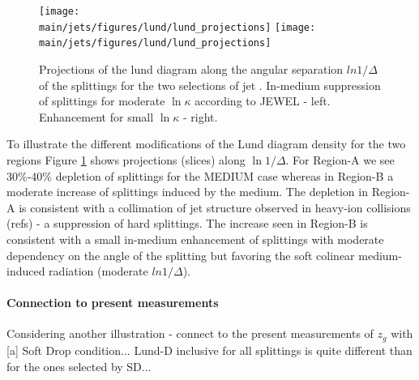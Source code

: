 \begin{figure}[htbp]
	\centering
	\texttt{[image: \\main/jets/figures/lund/lund\_projections]}
	\texttt{[image: \\main/jets/figures/lund/lund\_projections]}
	\caption{Projections of the lund diagram along the angular separation $ln 1/\Delta$ of the splittings for the two selections of jet \pt. In-medium suppression of splittings for moderate $\ln{\kappa}$ according to JEWEL - left. Enhancement for small $\ln{\kappa}$ - right.}
	\label{fig:Lund_projections}
\end{figure}

To illustrate the different modifications of the Lund diagram density for the two regions Figure \ref{fig:Lund_projections} shows projections (slices) along $\ln 1/\Delta$. For Region-A we see 30\%-40\% depletion of splittings for the MEDIUM case whereas in Region-B a moderate increase of splittings induced by the medium. The depletion in Region-A is consistent with a collimation of jet structure observed in heavy-ion collisions (refs) - a suppression of hard splittings. The increase seen in Region-B is consistent with a small in-medium enhancement of splittings with moderate dependency on the angle of the splitting but favoring the soft colinear medium-induced radiation (moderate $ln 1/\Delta$).

\paragraph{Connection to present measurements}

Considering another illustration - connect to the present measurements of $z_{g}$ with [a] Soft Drop condition... Lund-D inclusive for all splittings is quite different than for the ones selected by SD...

